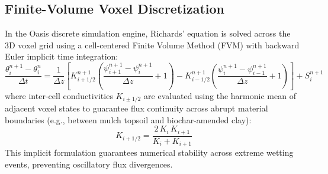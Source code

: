 \subsection{Finite-Volume Voxel Discretization}
In the Oasis discrete simulation engine, Richards' equation is solved across the 3D voxel grid using a cell-centered Finite Volume Method (FVM) with backward Euler implicit time integration:
\begin{equation}
\frac{\theta_i^{n+1} - \theta_i^n}{\Delta t} = \frac{1}{\Delta z} \left[ K_{i+1/2}^{n+1} \left( \frac{\psi_{i+1}^{n+1} - \psi_i^{n+1}}{\Delta z} + 1 \right) - K_{i-1/2}^{n+1} \left( \frac{\psi_i^{n+1} - \psi_{i-1}^{n+1}}{\Delta z} + 1 \right) \right] + S_i^{n+1}
\label{eq:fvm_richards}
\end{equation}
where inter-cell conductivities $K_{i \pm 1/2}$ are evaluated using the harmonic mean of adjacent voxel states to guarantee flux continuity across abrupt material boundaries (e.g., between mulch topsoil and biochar-amended clay):
\begin{equation}
K_{i+1/2} = \frac{2 \, K_i \, K_{i+1}}{K_i + K_{i+1}}
\label{eq:harmonic_conductivity}
\end{equation}
This implicit formulation guarantees numerical stability across extreme wetting events, preventing oscillatory flux divergences.

